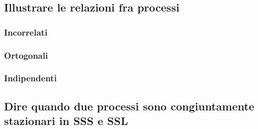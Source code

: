 \documentclass[12pt,oneside,openany]{memoir}
\numberwithin{equation}{subsection}
\begin{document}
\newpage
\subsection{Illustrare le relazioni fra processi}


\newpage
\subsubsection{Incorrelati}


\newpage
\subsubsection{Ortogonali}


\newpage
\subsubsection{Indipendenti}


\newpage
\subsection{Dire quando due processi sono congiuntamente stazionari in SSS e
SSL}


\appendix

\end{document}
